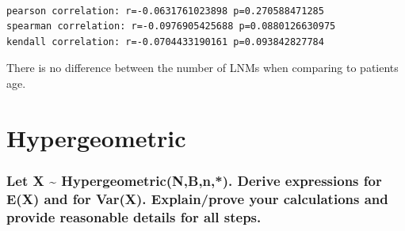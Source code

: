 \documentclass[11pt]{article}
\begin{document}
    \begin{center}
    \end{center}
    { \hspace*{\fill} \\}
    
    \begin{Verbatim}[commandchars=\\\{\}]
pearson correlation: r=-0.0631761023898 p=0.270588471285
spearman correlation: r=-0.0976905425688 p=0.0880126630975
kendall correlation: r=-0.0704433190161 p=0.093842827784

    \end{Verbatim}

    There is no difference between the number of LNMs when comparing to
patients age.

    \hypertarget{hypergeometric}{%
\section{Hypergeometric}\label{hypergeometric}}

    \hypertarget{let-x-hypergeometricnbn.derive-expressions-for-ex-and-for-varx.explainprove-your-calculations-and-provide-reasonable-details-for-all-steps.}{%
\subsubsection{Let X \textasciitilde{} Hypergeometric(N,B,n,*). Derive
expressions for E(X) and for Var(X). Explain/prove your calculations and
provide reasonable details for all
steps.}\label{let-x-hypergeometricnbn.derive-expressions-for-ex-and-for-varx.explainprove-your-calculations-and-provide-reasonable-details-for-all-steps.}}
\end{document}
